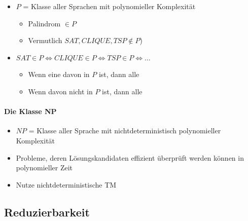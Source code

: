 \documentclass{scrartcl}
\begin{document}
\begin{itemize}
	\item $P$ = Klasse aller Sprachen mit polynomieller Komplexität
	\begin{itemize}
		\item Palindrom $\in P$
		\item Vermutlich $SAT,CLIQUE, TSP \not \in P$)
	\end{itemize}
	\item $SAT \in P \iff CLIQUE \in P \iff TSP \in P \iff \ldots$
	\begin{itemize}
		\item Wenn eine davon in $P$ ist, dann alle
		\item Wenn davon nicht in $P$ ist, dann alle
	\end{itemize}
\end{itemize}

\paragraph{Die Klasse NP}

\begin{itemize}
	\item $NP$ = Klasse aller Sprache mit nichtdeterministisch polynomieller Komplexität
	\item Probleme, deren Lösungskandidaten effizient überprüft werden können in polynomieller Zeit
	\item Nutze nichtdeterministische TM
\end{itemize}

\subsection{Reduzierbarkeit}
\end{document}
